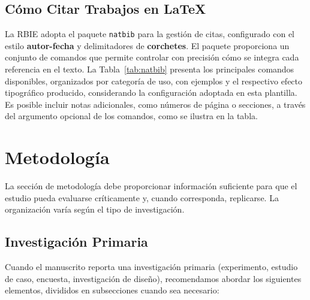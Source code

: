 \documentclass[spanish]{rbie2026}%
\begin{document}
\subsection{Cómo Citar Trabajos en \LaTeX}

La RBIE adopta el paquete \texttt{natbib} para la gestión de citas, configurado con el estilo \textbf{autor-fecha} y delimitadores de \textbf{corchetes}. El paquete proporciona un conjunto de comandos que permite controlar con precisión cómo se integra cada referencia en el texto. La Tabla~\ref{tab:natbib} presenta los principales comandos disponibles, organizados por categoría de uso, con ejemplos y el respectivo efecto tipográfico producido, considerando la configuración adoptada en esta plantilla. Es posible incluir notas adicionales, como números de página o secciones, a través del argumento opcional de los comandos, como se ilustra en la tabla.



\section{Metodología}
\label{sec:methods}

La sección de metodología debe proporcionar información suficiente para que el estudio pueda evaluarse críticamente y, cuando corresponda, replicarse. La organización varía según el tipo de investigación.

\subsection{Investigación Primaria}

Cuando el manuscrito reporta una investigación primaria (experimento, estudio de caso, encuesta, investigación de diseño), recomendamos abordar los siguientes elementos, divididos en subsecciones cuando sea necesario:
\end{document}
